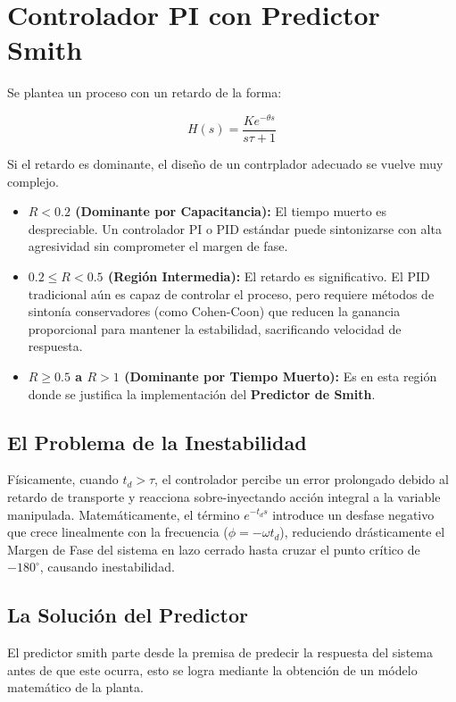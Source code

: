 \clearpage
\section{Controlador PI con Predictor Smith}
Se plantea un proceso con un retardo de la forma:

\[
  H(s) = \frac{K e^{-\theta s}}{s\tau + 1}
\]

Si el retardo es dominante, el diseño de un contrplador adecuado se vuelve muy complejo.

\begin{itemize}
    \item \textbf{$R < 0.2$ (Dominante por Capacitancia):} El tiempo muerto es despreciable. Un controlador PI o PID estándar puede sintonizarse con alta agresividad sin comprometer el margen de fase.
    \item \textbf{$0.2 \leq R < 0.5$ (Región Intermedia):} El retardo es significativo. El PID tradicional aún es capaz de controlar el proceso, pero requiere métodos de sintonía conservadores (como Cohen-Coon) que reducen la ganancia proporcional para mantener la estabilidad, sacrificando velocidad de respuesta.
    \item \textbf{$R \geq 0.5$ a $R > 1$ (Dominante por Tiempo Muerto):} Es en esta región donde se justifica la implementación del \textbf{Predictor de Smith}. 
\end{itemize}

\subsection{El Problema de la Inestabilidad}
Físicamente, cuando $t_d > \tau$, el controlador percibe un error prolongado debido al retardo de transporte y reacciona sobre-inyectando acción integral a la variable manipulada. Matemáticamente, el término $e^{-t_d s}$ introduce un desfase negativo que crece linealmente con la frecuencia ($\phi = -\omega t_d$), reduciendo drásticamente el Margen de Fase del sistema en lazo cerrado hasta cruzar el punto crítico de $-180^\circ$, causando inestabilidad.

\subsection{La Solución del Predictor}

El predictor smith parte desde la premisa de predecir la respuesta del sistema antes de que este ocurra, esto se logra mediante la obtención de un módelo matemático de la planta.

